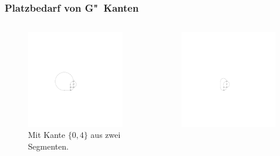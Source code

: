 \documentclass{beamer}
\begin{document}
\begin{frame}
  \frametitle{ Platzbedarf von G"~Kanten}

\begin{columns}[b]
\begin{column}{5cm}
\begin{figure}[h]
  \centering
  \includegraphics[scale=0.7]{exampleA/smooth}
  \caption{Mit Kante $\{0,4\}$ aus zwei Segmenten.}
  \label{fig:exampleAsmoothSimple}
\end{figure}
\end{column}
\begin{column}{5cm}
\begin{figure}[h]
  \centering
  \includegraphics[scale=0.7]{exampleA/smoothComplex}

\end{figure}
\end{column}
\end{columns}
\end{frame}
\end{document}
